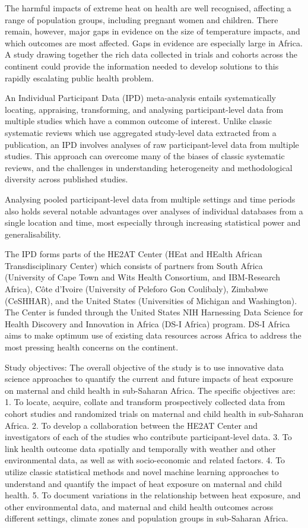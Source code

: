 \documentclass[12pt,letterpaper]{article}
\begin{document}
The harmful impacts of extreme heat on health are well recognised, affecting a range of population groups, including pregnant women and children. There remain, however, major gaps in evidence on the size of temperature impacts, and which outcomes are most affected. Gaps in evidence are especially large in Africa. A study drawing together the rich data collected in trials and cohorts across the continent could provide the information needed to develop solutions to this rapidly escalating public health problem.

An Individual Participant Data (IPD) meta-analysis entails systematically locating, appraising, transforming, and analysing participant-level data from multiple studies which have a common outcome of interest. Unlike classic systematic reviews which use aggregated study-level data extracted from a publication, an IPD involves analyses of raw participant-level data from multiple studies. This approach can overcome many of the biases of classic systematic reviews, and the challenges in understanding heterogeneity and methodological diversity across published studies.

Analysing pooled participant-level data from multiple settings and time periods also holds several notable advantages over analyses of individual databases from a single location and time, most especially through increasing statistical power and generalisability.

The IPD forms parts of the HE2AT Center (HEat and HEalth African Transdisciplinary Center) which consists of partners from South Africa (University of Cape Town and Wits Health Consortium, and IBM-Research Africa), Côte d’Ivoire (University of Peleforo Gon Coulibaly), Zimbabwe (CeSHHAR), and the United States (Universities of Michigan and Washington). The Center is funded through the United States NIH Harnessing Data Science for Health Discovery and Innovation in Africa (DS-I Africa) program. DS-I Africa aims to make optimum use of existing data resources across Africa to address the most pressing health concerns on the continent.

Study objectives: The overall objective of the study is to use innovative data science approaches to quantify the current and future impacts of heat exposure on maternal and child health in sub-Saharan Africa. The specific objectives are: 1.	To locate, acquire, collate and transform prospectively collected data from cohort studies and randomized trials on maternal and child health in sub-Saharan Africa. 2.	To develop a collaboration between the HE2AT Center and investigators of each of the studies who contribute participant-level data. 3.	To link health outcome data spatially and temporally with weather and other environmental data, as well as with socio-economic and related factors. 4.	To utilize classic statistical methods and novel machine learning approaches to understand and quantify the impact of heat exposure on maternal and child health. 5.	To document variations in the relationship between heat exposure, and other environmental data, and maternal and child health outcomes across different settings, climate zones and population groups in sub-Saharan Africa.
\end{document}
